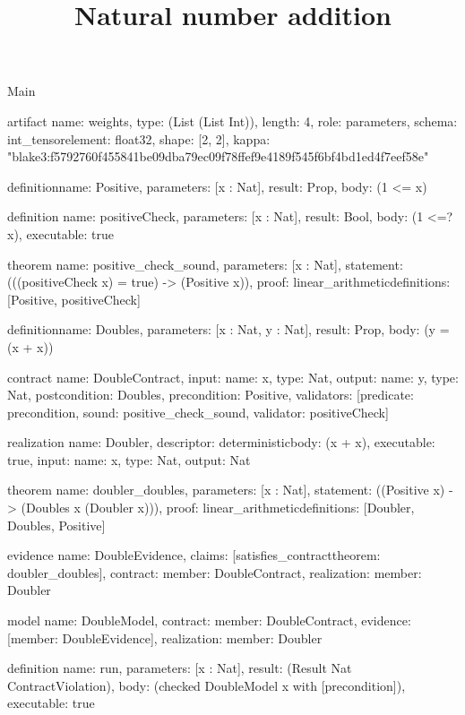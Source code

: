 \begin{lexlean}{Main}
\title{Natural number addition}
\begin{semanticmodule}
artifact{
  name: weights,
  type: (List (List Int)),
  length: 4,
  role: parameters,
  schema: int_tensor{element: float32, shape: [2, 2]},
  kappa: "blake3:f5792760f455841be09dba79ec09f78ffef9e4189f545f6bf4bd1ed4f7eef58e"
}

definition{name: Positive, parameters: [x : Nat], result: Prop, body: (1 <= x)}

definition{
  name: positiveCheck,
  parameters: [x : Nat],
  result: Bool,
  body: (1 <=? x),
  executable: true
}

theorem{
  name: positive_check_sound,
  parameters: [x : Nat],
  statement: (((positiveCheck x) = true) -> (Positive x)),
  proof: linear_arithmetic{definitions: [Positive, positiveCheck]}
}

definition{name: Doubles, parameters: [x : Nat, y : Nat], result: Prop, body: (y = (x + x))}

contract{
  name: DoubleContract,
  input: {name: x, type: Nat},
  output: {name: y, type: Nat},
  postcondition: Doubles,
  precondition: Positive,
  validators: [{predicate: precondition, sound: positive_check_sound, validator: positiveCheck}]
}

realization{
  name: Doubler,
  descriptor: deterministic{body: (x + x)},
  executable: true,
  input: {name: x, type: Nat},
  output: Nat
}

theorem{
  name: doubler_doubles,
  parameters: [x : Nat],
  statement: ((Positive x) -> (Doubles x (Doubler x))),
  proof: linear_arithmetic{definitions: [Doubler, Doubles, Positive]}
}

evidence{
  name: DoubleEvidence,
  claims: [satisfies_contract{theorem: doubler_doubles}],
  contract: {member: DoubleContract},
  realization: {member: Doubler}
}

model{
  name: DoubleModel,
  contract: {member: DoubleContract},
  evidence: [{member: DoubleEvidence}],
  realization: {member: Doubler}
}

definition{
  name: run,
  parameters: [x : Nat],
  result: (Result Nat ContractViolation),
  body: (checked DoubleModel x with [precondition]),
  executable: true
}
\end{semanticmodule}
\end{lexlean}
